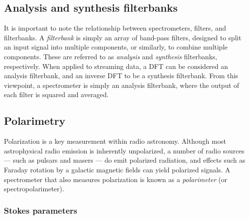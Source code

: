 \documentclass{ws-rv961x669}
\begin{document}
\subsection{Analysis and synthesis filterbanks}

It is important to note the relationship between spectrometers, filters, and filterbanks. A \emph{filterbank} is simply an array of band-pass filters, designed to split an input signal into multiple components, or similarly, to combine multiple components. These are referred to as \emph{analysis} and \emph{synthesis} filterbanks, respectively. When applied to streaming data, a DFT can be considered an analysis filterbank, and an inverse DFT to be a synthesis filterbank. From this viewpoint, a spectrometer is simply an analysis filterbank, where the output of each filter is squared and averaged.




\subsection{Polarimetry}

Polarization is a key measurement within radio astronomy.\citet{BookTinbergenPolarim}  Although most astrophysical radio emission is inherently unpolarized, a number of radio sources --- such as pulsars and masers --- do emit polarized radiation, and effects such as Faraday rotation by a galactic magnetic fields can yield polarized signals. A spectrometer that also measures polarization is known as a \emph{polarimeter} (or spectropolarimeter).

\subsubsection{Stokes parameters}
\end{document}
